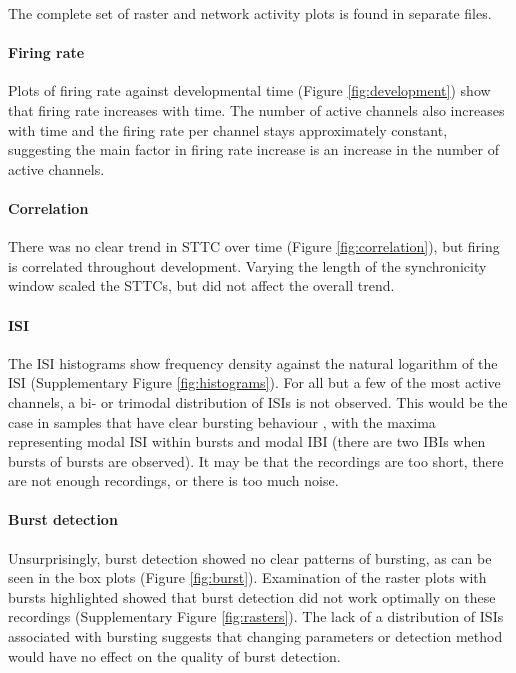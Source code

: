 \documentclass[10pt]{article}
\begin{document}
\par The complete set of raster and network activity plots is found in separate files.

\paragraph{Firing rate} Plots of firing rate against developmental time (Figure \ref{fig:development}) show that firing rate increases with time. The number of active channels also increases with time and the firing rate per channel stays approximately constant, suggesting the main factor in firing rate increase is an increase in the number of active channels.

\paragraph{Correlation} There was no clear trend in STTC over time (Figure \ref{fig:correlation}), but firing is correlated throughout development. Varying the length of the synchronicity window scaled the STTCs, but did not affect the overall trend.

\paragraph{ISI} The ISI histograms show frequency density against the natural logarithm of the ISI (Supplementary Figure \ref{fig:histograms}). For all but a few of the most active channels, a bi- or trimodal distribution of ISIs is not observed. This would be the case in samples that have clear bursting behaviour \cite{charlesworth_quantitative_2015}, with the maxima representing modal ISI within bursts and modal IBI (there are two IBIs when bursts of bursts are observed). It may be that the recordings are too short, there are not enough recordings, or there is too much noise.

\paragraph{Burst detection} Unsurprisingly, burst detection showed no clear patterns of bursting, as can be seen in the box plots (Figure \ref{fig:burst}). Examination of the raster plots with bursts highlighted showed that burst detection did not work optimally on these recordings (Supplementary Figure \ref{fig:rasters}). The lack of a distribution of ISIs associated with bursting suggests that changing parameters or detection method would have no effect on the quality of burst detection.
\end{document}
